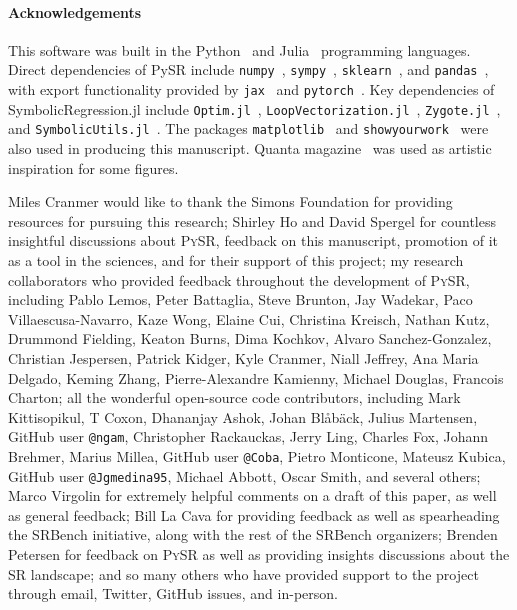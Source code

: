 \documentclass[letterpaper,twocolumn]{scrartcl}
\newcommand\pysr{\textsc{PySR}\xspace}
\begin{document}
\begin{linenumbers}
\paragraph{Acknowledgements}
This software was built in the Python~\cite{vanrossumPythonReferenceManual2009} and Julia~\cite{julia} programming languages.
Direct dependencies of PySR include
\texttt{numpy}~\cite{numpy},
\texttt{sympy}~\cite{sympy},
\texttt{sklearn}~\cite{sklearn},
and
\texttt{pandas}~\cite{pandas},
with export functionality provided by
\texttt{jax}~\cite{jax}
and
\texttt{pytorch}~\cite{torch}.
Key dependencies of SymbolicRegression.jl include
\texttt{Optim.jl}~\cite{mogensenOptimMathematicalOptimization2018}, \texttt{LoopVectorization.jl}~\cite{elrodLoopVectorizationJlMacro2022}, \texttt{Zygote.jl}~\cite{innesDonUnrollAdjoint2018}, and
\texttt{SymbolicUtils.jl}~\cite{gowdaHighperformanceSymbolicnumericsMultiple2022}.
The packages \texttt{matplotlib}~\cite{matplotlib} and
\texttt{showyourwork}~\cite{lugerShowyourwork2021}
were also used in producing this manuscript.
Quanta magazine~\cite{woodPowerfulMachineScientists2022} was used as artistic inspiration for some figures.

Miles Cranmer would like to thank
the Simons Foundation for providing resources for pursuing this research;
Shirley Ho and David Spergel for countless insightful discussions about \pysr, feedback on this manuscript, promotion of it as a tool in the sciences, and for their support of this project;
my research collaborators who provided feedback throughout the development of \pysr, including Pablo Lemos, Peter Battaglia, Steve Brunton, Jay Wadekar, Paco Villaescusa-Navarro, Kaze Wong, Elaine Cui, Christina Kreisch, Nathan Kutz, Drummond Fielding, Keaton Burns, Dima Kochkov, Alvaro Sanchez-Gonzalez, Christian Jespersen, Patrick Kidger, Kyle Cranmer, Niall Jeffrey, Ana Maria Delgado, Keming Zhang, Pierre-Alexandre Kamienny, Michael Douglas, Francois Charton;
all the wonderful open-source code contributors, including Mark Kittisopikul, T Coxon, Dhananjay Ashok, Johan Blåbäck, Julius Martensen, GitHub user \texttt{@ngam}, Christopher Rackauckas, Jerry Ling, Charles Fox, Johann Brehmer, Marius Millea, GitHub user \texttt{@Coba}, Pietro Monticone, Mateusz Kubica, GitHub user \texttt{@Jgmedina95}, Michael Abbott, Oscar Smith, and several others;
Marco Virgolin for extremely helpful comments on a draft of this paper, as well as general feedback;
Bill La Cava for providing feedback as well as spearheading the SRBench initiative, along with the rest of the SRBench organizers;
Brenden Petersen for feedback on \pysr as well as providing insights discussions about the SR landscape;
and so many others who have provided support to the project through email, Twitter, GitHub issues, and in-person.

\end{linenumbers}




\end{document}
